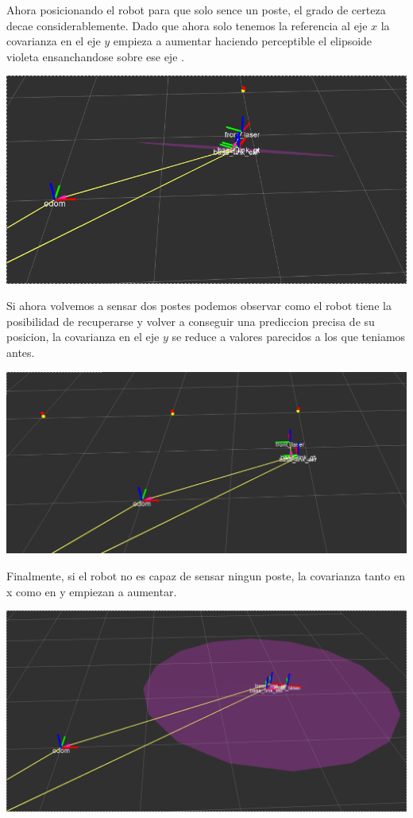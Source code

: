 Ahora posicionando el robot para que solo sence un poste, el grado de certeza decae considerablemente. Dado que ahora solo tenemos la referencia al eje $x$ la covarianza en el eje $y$ empieza a aumentar haciendo perceptible el elipsoide violeta ensanchandose sobre ese eje .

\includegraphics[scale=0.3]{punto4/ekfViendoUnPoste.png}

Si ahora volvemos a sensar dos postes podemos observar como el robot tiene la posibilidad de recuperarse y volver a conseguir una prediccion precisa de su posicion, la covarianza en el eje $y$ se reduce a valores parecidos a los que teniamos antes.

\includegraphics[scale=0.3]{punto4/ekfViendoTresPostesOtraVez.png}

Finalmente, si el robot no es capaz de sensar ningun poste, la covarianza tanto en x como en y empiezan a aumentar.

\includegraphics[scale=0.3]{punto4/ekfSinVerNingunPoste.png}


